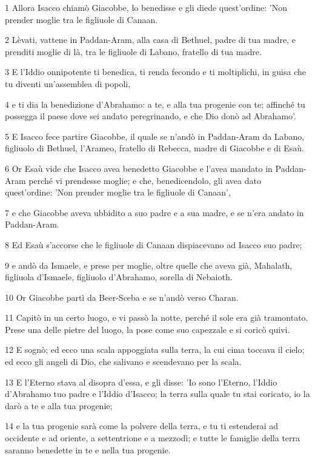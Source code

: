 \par 1 Allora Isacco chiamò Giacobbe, lo benedisse e gli diede quest'ordine: 'Non prender moglie tra le figliuole di Canaan.
\par 2 Lèvati, vattene in Paddan-Aram, alla casa di Bethuel, padre di tua madre, e prenditi moglie di là, tra le figliuole di Labano, fratello di tua madre.
\par 3 E l'Iddio onnipotente ti benedica, ti renda fecondo e ti moltiplichi, in guisa che tu diventi un'assemblea di popoli,
\par 4 e ti dia la benedizione d'Abrahamo: a te, e alla tua progenie con te; affinché tu possegga il paese dove sei andato peregrinando, e che Dio donò ad Abrahamo'.
\par 5 E Isacco fece partire Giacobbe, il quale se n'andò in Paddan-Aram da Labano, figliuolo di Bethuel, l'Arameo, fratello di Rebecca, madre di Giacobbe e di Esaù.
\par 6 Or Esaù vide che Isacco avea benedetto Giacobbe e l'avea mandato in Paddan-Aram perché vi prendesse moglie; e che, benedicendolo, gli avea dato quest'ordine: 'Non prender moglie tra le figliuole di Canaan',
\par 7 e che Giacobbe aveva ubbidito a suo padre e a sua madre, e se n'era andato in Paddan-Aram.
\par 8 Ed Esaù s'accorse che le figliuole di Canaan dispiacevano ad Isacco suo padre;
\par 9 e andò da Ismaele, e prese per moglie, oltre quelle che aveva già, Mahalath, figliuola d'Ismaele, figliuolo d'Abrahamo, sorella di Nebaioth.
\par 10 Or Giacobbe partì da Beer-Sceba e se n'andò verso Charan.
\par 11 Capitò in un certo luogo, e vi passò la notte, perché il sole era già tramontato. Prese una delle pietre del luogo, la pose come suo capezzale e si coricò quivi.
\par 12 E sognò; ed ecco una scala appoggiata sulla terra, la cui cima toccava il cielo; ed ecco gli angeli di Dio, che salivano e scendevano per la scala.
\par 13 E l'Eterno stava al disopra d'essa, e gli disse: 'Io sono l'Eterno, l'Iddio d'Abrahamo tuo padre e l'Iddio d'Isacco; la terra sulla quale tu stai coricato, io la darò a te e alla tua progenie;
\par 14 e la tua progenie sarà come la polvere della terra, e tu ti estenderai ad occidente e ad oriente, a settentrione e a mezzodì; e tutte le famiglie della terra saranno benedette in te e nella tua progenie.
